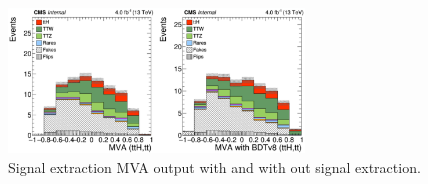 \begin{figure}[htb]
 \centering
   \includegraphics[width=0.7\textwidth]{plots_reconstruction/reconstruction_extraction_mva_output.png}
   \caption{Signal extraction MVA output with and with out signal extraction.}
  \label{reconstruction:extraction_output}
\end{figure}
